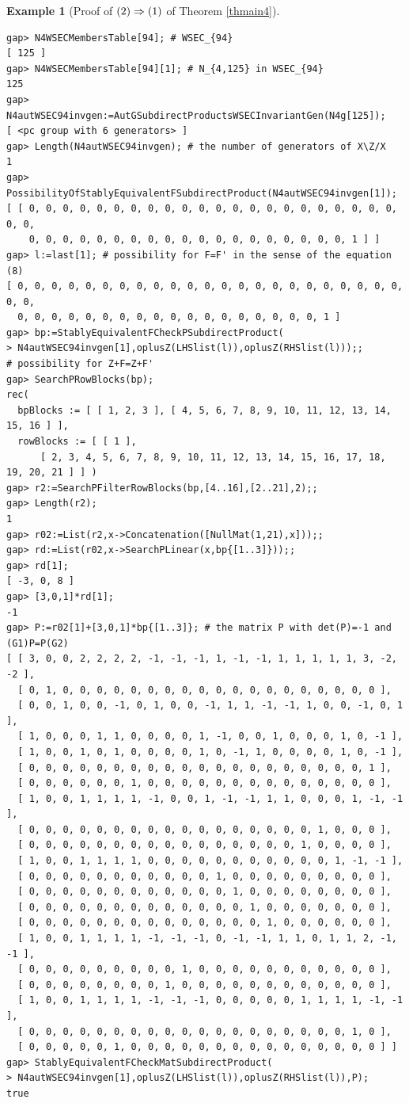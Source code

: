\documentclass{amsart}
\theoremstyle{plain}
\theoremstyle{definition}
\newtheorem{example}[theorem]{Example}
\theoremstyle{remark}
\begin{document}
\begin{example}[Proof of ${\rm (2)}\Rightarrow {\rm (1)}$ of {Theorem \ref{thmain4}}]
\begin{verbatim}
gap> N4WSECMembersTable[94]; # WSEC_{94}
[ 125 ]
gap> N4WSECMembersTable[94][1]; # N_{4,125} in WSEC_{94}
125
gap> N4autWSEC94invgen:=AutGSubdirectProductsWSECInvariantGen(N4g[125]);
[ <pc group with 6 generators> ]
gap> Length(N4autWSEC94invgen); # the number of generators of X\Z/X
1
gap> PossibilityOfStablyEquivalentFSubdirectProduct(N4autWSEC94invgen[1]);
[ [ 0, 0, 0, 0, 0, 0, 0, 0, 0, 0, 0, 0, 0, 0, 0, 0, 0, 0, 0, 0, 0, 0, 0, 0, 
    0, 0, 0, 0, 0, 0, 0, 0, 0, 0, 0, 0, 0, 0, 0, 0, 0, 0, 0, 1 ] ]
gap> l:=last[1]; # possibility for F=F' in the sense of the equation (8)
[ 0, 0, 0, 0, 0, 0, 0, 0, 0, 0, 0, 0, 0, 0, 0, 0, 0, 0, 0, 0, 0, 0, 0, 0, 0, 
  0, 0, 0, 0, 0, 0, 0, 0, 0, 0, 0, 0, 0, 0, 0, 0, 0, 0, 1 ]
gap> bp:=StablyEquivalentFCheckPSubdirectProduct(
> N4autWSEC94invgen[1],oplusZ(LHSlist(l)),oplusZ(RHSlist(l)));;
# possibility for Z+F=Z+F'
gap> SearchPRowBlocks(bp);
rec( 
  bpBlocks := [ [ 1, 2, 3 ], [ 4, 5, 6, 7, 8, 9, 10, 11, 12, 13, 14, 15, 16 ] ], 
  rowBlocks := [ [ 1 ], 
      [ 2, 3, 4, 5, 6, 7, 8, 9, 10, 11, 12, 13, 14, 15, 16, 17, 18, 19, 20, 21 ] ] )
gap> r2:=SearchPFilterRowBlocks(bp,[4..16],[2..21],2);;
gap> Length(r2);
1
gap> r02:=List(r2,x->Concatenation([NullMat(1,21),x]));;
gap> rd:=List(r02,x->SearchPLinear(x,bp{[1..3]}));;
gap> rd[1];
[ -3, 0, 8 ]
gap> [3,0,1]*rd[1];
-1
gap> P:=r02[1]+[3,0,1]*bp{[1..3]}; # the matrix P with det(P)=-1 and (G1)P=P(G2)
[ [ 3, 0, 0, 2, 2, 2, 2, -1, -1, -1, 1, -1, -1, 1, 1, 1, 1, 1, 3, -2, -2 ], 
  [ 0, 1, 0, 0, 0, 0, 0, 0, 0, 0, 0, 0, 0, 0, 0, 0, 0, 0, 0, 0, 0 ], 
  [ 0, 0, 1, 0, 0, -1, 0, 1, 0, 0, -1, 1, 1, -1, -1, 1, 0, 0, -1, 0, 1 ], 
  [ 1, 0, 0, 0, 1, 1, 0, 0, 0, 0, 1, -1, 0, 0, 1, 0, 0, 0, 1, 0, -1 ], 
  [ 1, 0, 0, 1, 0, 1, 0, 0, 0, 0, 1, 0, -1, 1, 0, 0, 0, 0, 1, 0, -1 ], 
  [ 0, 0, 0, 0, 0, 0, 0, 0, 0, 0, 0, 0, 0, 0, 0, 0, 0, 0, 0, 0, 1 ], 
  [ 0, 0, 0, 0, 0, 0, 1, 0, 0, 0, 0, 0, 0, 0, 0, 0, 0, 0, 0, 0, 0 ], 
  [ 1, 0, 0, 1, 1, 1, 1, -1, 0, 0, 1, -1, -1, 1, 1, 0, 0, 0, 1, -1, -1 ], 
  [ 0, 0, 0, 0, 0, 0, 0, 0, 0, 0, 0, 0, 0, 0, 0, 0, 0, 1, 0, 0, 0 ], 
  [ 0, 0, 0, 0, 0, 0, 0, 0, 0, 0, 0, 0, 0, 0, 0, 0, 1, 0, 0, 0, 0 ], 
  [ 1, 0, 0, 1, 1, 1, 1, 0, 0, 0, 0, 0, 0, 0, 0, 0, 0, 0, 1, -1, -1 ], 
  [ 0, 0, 0, 0, 0, 0, 0, 0, 0, 0, 0, 1, 0, 0, 0, 0, 0, 0, 0, 0, 0 ], 
  [ 0, 0, 0, 0, 0, 0, 0, 0, 0, 0, 0, 0, 1, 0, 0, 0, 0, 0, 0, 0, 0 ], 
  [ 0, 0, 0, 0, 0, 0, 0, 0, 0, 0, 0, 0, 0, 1, 0, 0, 0, 0, 0, 0, 0 ], 
  [ 0, 0, 0, 0, 0, 0, 0, 0, 0, 0, 0, 0, 0, 0, 1, 0, 0, 0, 0, 0, 0 ], 
  [ 1, 0, 0, 1, 1, 1, 1, -1, -1, -1, 0, -1, -1, 1, 1, 0, 1, 1, 2, -1, -1 ], 
  [ 0, 0, 0, 0, 0, 0, 0, 0, 0, 1, 0, 0, 0, 0, 0, 0, 0, 0, 0, 0, 0 ], 
  [ 0, 0, 0, 0, 0, 0, 0, 0, 1, 0, 0, 0, 0, 0, 0, 0, 0, 0, 0, 0, 0 ], 
  [ 1, 0, 0, 1, 1, 1, 1, -1, -1, -1, 0, 0, 0, 0, 0, 1, 1, 1, 1, -1, -1 ], 
  [ 0, 0, 0, 0, 0, 0, 0, 0, 0, 0, 0, 0, 0, 0, 0, 0, 0, 0, 0, 1, 0 ], 
  [ 0, 0, 0, 0, 0, 1, 0, 0, 0, 0, 0, 0, 0, 0, 0, 0, 0, 0, 0, 0, 0 ] ]
gap> StablyEquivalentFCheckMatSubdirectProduct(
> N4autWSEC94invgen[1],oplusZ(LHSlist(l)),oplusZ(RHSlist(l)),P);
true


\end{verbatim}
\end{example}
\end{document}
